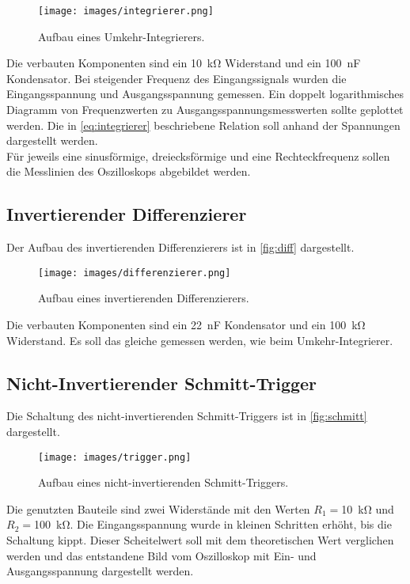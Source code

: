 \begin{figure}[H]
    \centering
    \texttt{[image: images/integrierer.png]}
    \caption{Aufbau eines Umkehr-Integrierers.\cite{V51}}
    \label{fig:integr}
\end{figure}

Die verbauten Komponenten sind ein \SI{10}{\kilo\ohm} Widerstand und ein \SI{100}{\nano\farad} Kondensator.
Bei steigender Frequenz des Eingangssignals wurden die Eingangsspannung und Ausgangsspannung gemessen.
Ein doppelt logarithmisches Diagramm von Frequenzwerten zu Ausgangsspannungsmesswerten sollte geplottet werden.
Die in \autoref{eq:integrierer} beschriebene Relation soll anhand der Spannungen dargestellt werden.\\
Für jeweils eine sinusförmige, dreiecksförmige und eine Rechteckfrequenz sollen die Messlinien des Oszilloskops abgebildet werden.

\subsection{Invertierender Differenzierer}
Der Aufbau des invertierenden Differenzierers ist in \autoref{fig:diff} dargestellt.

\begin{figure}[H]
    \centering
    \texttt{[image: images/differenzierer.png]}
    \caption{Aufbau eines invertierenden Differenzierers.\cite{V51}}
    \label{fig:diff}
\end{figure}

Die verbauten Komponenten sind ein \SI{22}{\nano\farad} Kondensator und ein \SI{100}{\kilo\ohm} Widerstand.
Es soll das gleiche gemessen werden, wie beim Umkehr-Integrierer.

\subsection{Nicht-Invertierender Schmitt-Trigger}
Die Schaltung des nicht-invertierenden Schmitt-Triggers ist in \autoref{fig:schmitt} dargestellt.

\begin{figure}[H]
    \centering
    \texttt{[image: images/trigger.png]}
    \caption{Aufbau eines nicht-invertierenden Schmitt-Triggers.\cite{V51}}
    \label{fig:schmitt}
\end{figure}

Die genutzten Bauteile sind zwei Widerstände mit den Werten $R_1 = $\SI{10}{\kilo\ohm} und $R_2 = $\SI{100}{\kilo\ohm}.
Die Eingangsspannung wurde in kleinen Schritten erhöht, bis die Schaltung kippt.
Dieser Scheitelwert soll mit dem theoretischen Wert verglichen werden und das entstandene Bild vom Oszilloskop mit Ein- und Ausgangsspannung dargestellt werden.

